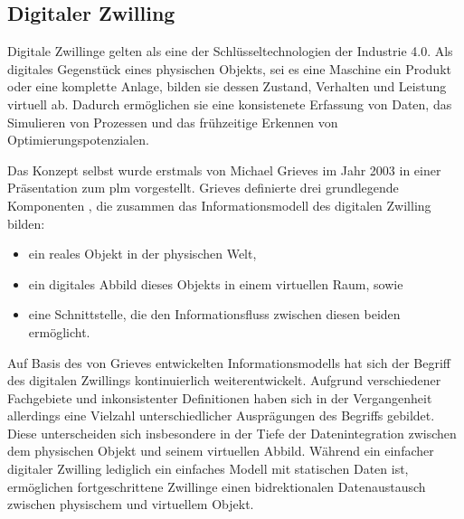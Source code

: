 
\newpage
\subsection{Digitaler Zwilling}
\label{sec: DT}
Digitale Zwillinge gelten als eine der Schlüsseltechnologien der Industrie 4.0.
Als digitales Gegenstück eines physischen Objekts, sei es eine Maschine ein Produkt oder eine komplette Anlage, bilden sie dessen Zustand, Verhalten und Leistung virtuell ab.
Dadurch ermöglichen sie eine konsistenete Erfassung von Daten, das Simulieren von Prozessen und das frühzeitige Erkennen von Optimierungspotenzialen.

Das Konzept selbst wurde erstmals von Michael Grieves im Jahr 2003 in einer Präsentation zum \ac{plm} vorgestellt. 
Grieves definierte drei grundlegende Komponenten \cite{DTGrieves} , die zusammen das Informationsmodell des digitalen Zwilling bilden:
\begin{itemize}
    \item ein reales Objekt in der physischen Welt,
    \item ein digitales Abbild dieses Objekts in einem virtuellen Raum, sowie
    \item eine Schnittstelle, die den Informationsfluss zwischen diesen beiden ermöglicht.
\end{itemize}

Auf Basis des von Grieves entwickelten Informationsmodells hat sich der Begriff des digitalen Zwillings kontinuierlich weiterentwickelt.
Aufgrund verschiedener Fachgebiete und inkonsistenter Definitionen haben sich in der Vergangenheit allerdings eine Vielzahl unterschiedlicher Ausprägungen des Begriffs gebildet.
Diese unterscheiden sich insbesondere in der Tiefe der Datenintegration zwischen dem physischen Objekt und seinem virtuellen Abbild.
Während ein einfacher digitaler Zwilling lediglich ein einfaches Modell mit statischen Daten ist, ermöglichen fortgeschrittene Zwillinge einen bidrektionalen Datenaustausch zwischen physischem und virtuellem Objekt. 

